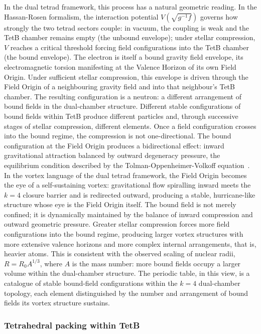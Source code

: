 \documentclass[aps,prd,preprint,superscriptaddress,showpacs,preprintnumbers,amsmath,amssymb,nofootinbib]{revtex4-2}
\begin{document}
In the dual tetrad framework, this process has a natural geometric reading. In the Hassan-Rosen formalism, the interaction potential $V(\sqrt{g^{-1}f})$ governs how strongly the two tetrad sectors couple: in vacuum, the coupling is weak and the TetB chamber remains empty (the unbound envelope); under stellar compression, $V$ reaches a critical threshold forcing field configurations into the TetB chamber (the bound envelope). The electron is itself a bound gravity field envelope, its electromagnetic torsion manifesting at the Valence Horizon of its own Field Origin. Under sufficient stellar compression, this envelope is driven through the Field Origin of a neighbouring gravity field and into that neighbour's TetB chamber. The resulting configuration is a neutron: a different arrangement of bound fields in the dual-chamber structure. Different stable configurations of bound fields within TetB produce different particles and, through successive stages of stellar compression, different elements. Once a field configuration crosses into the bound regime, the compression is not one-directional. The bound configuration at the Field Origin produces a bidirectional effect: inward gravitational attraction balanced by outward degeneracy pressure, the equilibrium condition described by the Tolman-Oppenheimer-Volkoff equation~\cite{oppenheimer1939}. In the vortex language of the dual tetrad framework, the Field Origin becomes the eye of a self-sustaining vortex: gravitational flow spiralling inward meets the $k = 4$ closure barrier and is redirected outward, producing a stable, hurricane-like structure whose eye is the Field Origin itself. The bound field is not merely confined; it is dynamically maintained by the balance of inward compression and outward geometric pressure. Greater stellar compression forces more field configurations into the bound regime, producing larger vortex structures with more extensive valence horizons and more complex internal arrangements, that is, heavier atoms. This is consistent with the observed scaling of nuclear radii, $R = R_0 A^{1/3}$, where $A$ is the mass number: more bound fields occupy a larger volume within the dual-chamber structure. The periodic table, in this view, is a catalogue of stable bound-field configurations within the $k = 4$ dual-chamber topology, each element distinguished by the number and arrangement of bound fields its vortex structure sustains.

\subsubsection*{Tetrahedral packing within TetB}
\end{document}
